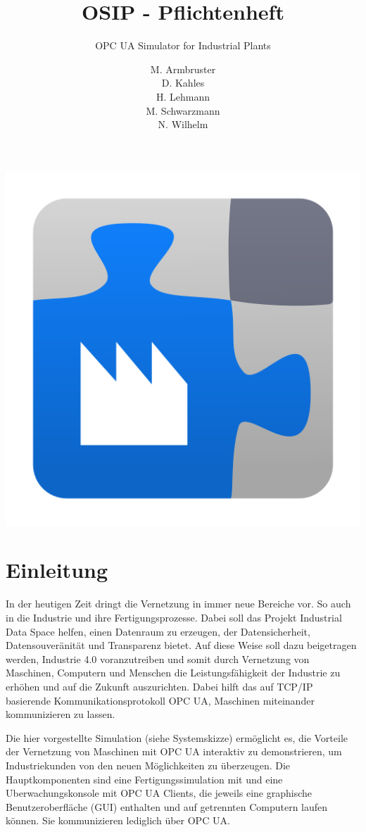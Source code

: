 \documentclass[parskip=full]{scrartcl}
\title{OSIP - Pflichtenheft}
\subtitle{\gls{OPC UA} Simulator for Industrial Plants}
\author{
    M. Armbruster\\
    D. Kahles\\
    H. Lehmann\\
    M. Schwarzmann\\
    N. Wilhelm
}
\begin{document}
\maketitle

\vspace{20px}
\begin{center}
  \includegraphics[scale=0.4]{../icon.png}
\end{center}
\pagebreak
\tableofcontents
\pagebreak

\section{Einleitung}
In der heutigen Zeit dringt die Vernetzung in immer neue Bereiche vor. So auch in die Industrie und ihre Fertigungsprozesse.
Dabei soll das Projekt \gls{Industrial Data Space} helfen, einen Datenraum zu erzeugen, der Datensicherheit, Datensouveränität und
Transparenz bietet. Auf diese Weise soll dazu beigetragen werden, Industrie 4.0 voranzutreiben und somit durch Vernetzung von
Maschinen, Computern und Menschen die Leistungsfähigkeit der Industrie zu erhöhen und auf die Zukunft auszurichten.
Dabei hilft das auf \gls{TCP/IP} basierende Kommunikationsprotokoll \gls{OPC UA}, Maschinen miteinander kommunizieren zu lassen.

Die hier vorgestellte Simulation (siehe Systemskizze) ermöglicht es, die Vorteile der Vernetzung von Maschinen mit \gls{OPC UA} interaktiv
zu demonstrieren, um Industriekunden von den neuen Möglichkeiten zu überzeugen. Die Hauptkomponenten sind eine \gls{Fertigungssimulation}
mit  und eine \gls{Uberwachungskonsole} mit \glspl{OPC UA Client}, die jeweils eine graphische
Benutzeroberfläche (\gls{GUI}) enthalten und auf getrennten Computern laufen können. Sie kommunizieren lediglich über \gls{OPC UA}.
\end{document}
